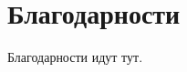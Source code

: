 \documentclass{mipt-thesis-bs}
\begin{document}
    
    
    



    \backmatter
    
    

    \chapter{Благодарности}

    Благодарности идут тут.

    
\end{document}
